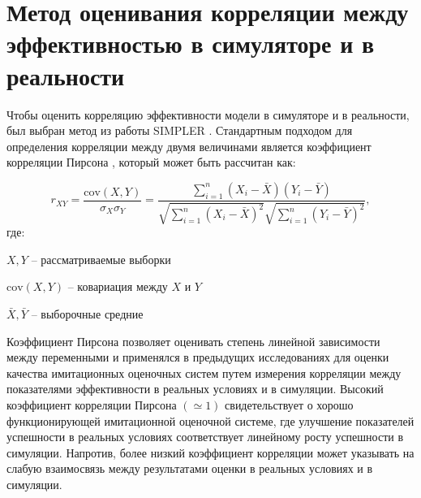 \section{Метод оценивания корреляции между эффективностью в симуляторе и в реальности}
    
    Чтобы оценить корреляцию эффективности модели в симуляторе и в реальности, был выбран метод из работы SIMPLER \cite{li24simpler}. Стандартным подходом для определения корреляции между двумя величинами является коэффициент корреляции Пирсона \cite{Pearson}, который может быть рассчитан как:

    \begin{equation}
    r_{XY} = \frac{\text{cov}(X, Y)}{\sigma_X \sigma_Y} = \frac{\sum_{i=1}^n (X_i - \bar{X})(Y_i - \bar{Y})}{\sqrt{\sum_{i=1}^n (X_i - \bar{X})^2} \sqrt{\sum_{i=1}^n (Y_i - \bar{Y})^2}},
    \end{equation}
    где:
    \begin{description}
        \item $X, Y$ -- рассматриваемые выборки
        \item $\text{cov}(X, Y)$ -- ковариация между $X$ и $Y$
        \item $\bar{X}, \bar{Y}$ -- выборочные средние
    \end{description}
    
    Коэффициент Пирсона позволяет оценивать степень линейной зависимости между переменными и применялся в предыдущих исследованиях для оценки качества имитационных оценочных систем \cite{Kadian_2020} путем измерения корреляции между показателями эффективности в реальных условиях и в симуляции. Высокий коэффициент корреляции Пирсона $(\simeq 1)$ свидетельствует о хорошо функционирующей имитационной оценочной системе, где улучшение показателей успешности в реальных условиях соответствует линейному росту успешности в симуляции. Напротив, более низкий коэффициент корреляции может указывать на слабую взаимосвязь между результатами оценки в реальных условиях и в симуляции. 

    
    
    
